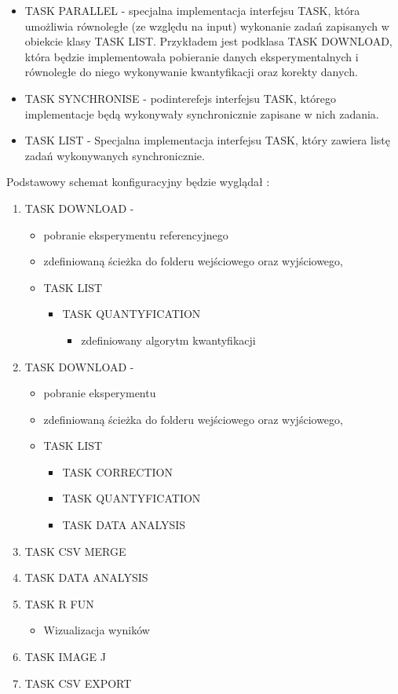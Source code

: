 \begin{itemize}
\begin{itemize}
\item TASK PARALLEL - specjalna implementacja interfejsu TASK, która umożliwia równoległe (ze względu na input) wykonanie zadań zapisanych w obiekcie klasy TASK LIST. Przykładem jest podklasa TASK DOWNLOAD, która będzie implementowała pobieranie danych eksperymentalnych i równoległe do niego wykonywanie kwantyfikacji oraz korekty danych.
\item TASK SYNCHRONISE - podinterefejs interfejsu  TASK, którego implementacje będą wykonywały synchronicznie zapisane w nich zadania.
\item TASK LIST - Specjalna implementacja interfejsu TASK, który zawiera listę zadań wykonywanych synchronicznie.
\end{itemize}

Podstawowy schemat konfiguracyjny będzie wyglądał :
\begin{enumerate}
\item TASK DOWNLOAD - 
\begin{itemize}
\item pobranie eksperymentu referencyjnego
\item zdefiniowaną ścieżka do folderu wejściowego oraz wyjściowego,
\item TASK LIST
\begin{itemize}
\item TASK QUANTYFICATION 
\begin{itemize}
\item zdefiniowany algorytm kwantyfikacji
\end{itemize}
\end{itemize}
\end{itemize}
\item TASK DOWNLOAD - 
\begin{itemize}
\item pobranie eksperymentu 
\item zdefiniowaną ścieżka do folderu wejściowego oraz wyjściowego,
\item TASK LIST
\begin{itemize}
\item TASK CORRECTION
\item TASK QUANTYFICATION
\item TASK DATA ANALYSIS
\end{itemize}
\end{itemize}
\item TASK CSV MERGE
\item TASK DATA ANALYSIS
\item TASK R FUN 
\begin{itemize}
\item Wizualizacja wyników
\end{itemize}
\item TASK IMAGE J
\item TASK CSV EXPORT
\end{enumerate}


\end{itemize}
